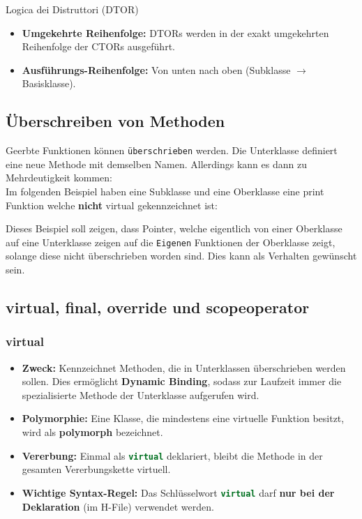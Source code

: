 

\par{Logica dei Distruttori (DTOR)}
\begin{itemize}
    \item \textbf{Umgekehrte Reihenfolge:} DTORs werden in der exakt umgekehrten Reihenfolge der CTORs ausgeführt.
    \item \textbf{Ausführungs-Reihenfolge:} Von unten nach oben (Subklasse $\rightarrow$ Basisklasse).
\end{itemize}

\subsection{Überschreiben von Methoden}

Geerbte Funktionen können \texttt{überschrieben} werden. 
Die Unterklasse definiert eine neue Methode mit demselben Namen.
Allerdings kann es dann zu Mehrdeutigkeit kommen:\\
Im folgenden Beispiel haben eine Subklasse und eine Oberklasse eine print Funktion welche \textbf{nicht} virtual gekennzeichnet ist:



Dieses Beispiel soll zeigen, dass Pointer, welche eigentlich von einer Oberklasse auf eine Unterklasse zeigen auf die \texttt{Eigenen} Funktionen der Oberklasse zeigt, solange diese nicht überschrieben worden sind. 
Dies kann als Verhalten gewünscht sein. 

\subsection{virtual, final, override und scopeoperator}

\subsubsection{virtual}\label{Virtual}
\begin{itemize}
    \item \textbf{Zweck:} Kennzeichnet Methoden, die in Unterklassen überschrieben werden sollen. 
Dies ermöglicht \textbf{Dynamic Binding}, sodass zur Laufzeit immer die spezialisierte Methode der Unterklasse aufgerufen wird.
    \item \textbf{Polymorphie:} Eine Klasse, die mindestens eine virtuelle Funktion besitzt, wird als \textbf{polymorph} bezeichnet.
    \item \textbf{Vererbung:} Einmal als \lstinline[language=C++]|virtual| deklariert, bleibt die Methode in der gesamten Vererbungskette virtuell. 
    \item \textbf{Wichtige Syntax-Regel:} Das Schlüsselwort \lstinline[language=C++]|virtual| darf 
    \textbf{nur bei der Deklaration} (im H-File) verwendet werden.
\end{itemize}

